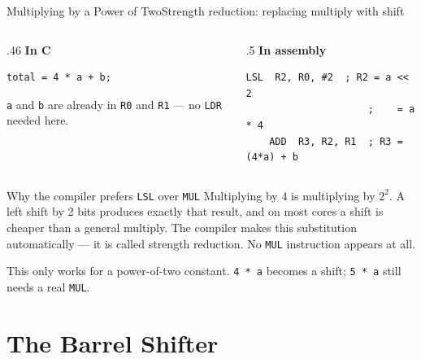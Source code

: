 \documentclass[9pt,aspectratio=169,xcolor=table]{beamer}
\begin{document}
\begin{frame}[fragile]{Multiplying by a Power of Two}{Strength reduction: replacing multiply with shift}
    \begin{columns}[T]
    \begin{column}{.46\textwidth}
        \textbf{In C}

        \vspace{1mm}
        \begin{lstlisting}[style=myc]
total = 4 * a + b;
        \end{lstlisting}

        \vspace{2mm}
        {\small \texttt{a} and \texttt{b} are already in \texttt{R0} and
        \texttt{R1} --- no \texttt{LDR} needed here.}
    \end{column}
    \begin{column}{.5\textwidth}
        \textbf{In assembly}

        \vspace{1mm}
        \begin{lstlisting}[style=armasm, language=ARM]
	LSL  R2, R0, #2  ; R2 = a << 2
	                 ;    = a * 4
	ADD  R3, R2, R1  ; R3 = (4*a) + b
        \end{lstlisting}
    \end{column}
    \end{columns}

    \vspace{3mm}
    \begin{block}{Why the compiler prefers \texttt{LSL} over \texttt{MUL}}
        Multiplying by \alert{4} is multiplying by $2^2$. A left shift
        by 2 bits produces exactly that result, and on most cores a
        shift is \alert{cheaper} than a general multiply. The compiler
        makes this substitution automatically --- it is called
        \alert{strength reduction}. No \texttt{MUL} instruction appears
        at all.
    \end{block}

    \vspace{1mm}
    {\small This only works for a power-of-two constant. \texttt{4 * a}
    becomes a shift; \texttt{5 * a} still needs a real \texttt{MUL}.}
\end{frame}
\section{The Barrel Shifter}
\end{document}
